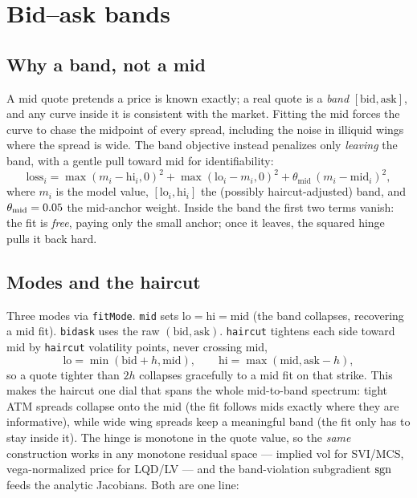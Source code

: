 \documentclass[11pt]{article}
\begin{document}
\section{Bid--ask bands}
\label{sec:band}

\subsection{Why a band, not a mid}

A mid quote pretends a price is known exactly; a real quote is a \emph{band}
$[\text{bid},\text{ask}]$, and any curve inside it is consistent with the market.
Fitting the mid forces the curve to chase the midpoint of every spread, including
the noise in illiquid wings where the spread is wide. The band objective instead
penalizes only \emph{leaving} the band, with a gentle pull toward mid for
identifiability:
\begin{equation}
\boxed{\;\text{loss}_i=\max(m_i-\text{hi}_i,0)^2+\max(\text{lo}_i-m_i,0)^2
+\theta_{\text{mid}}\,(m_i-\text{mid}_i)^2,\;}
\label{eq:band}
\end{equation}
where $m_i$ is the model value, $[\text{lo}_i,\text{hi}_i]$ the (possibly
haircut-adjusted) band, and $\theta_{\text{mid}}=0.05$ the mid-anchor
weight. Inside the band the first two terms vanish: the fit is \emph{free}, paying
only the small anchor; once it leaves, the squared hinge pulls it back hard.

\subsection{Modes and the haircut}

Three modes via \texttt{fitMode}. \texttt{mid} sets
$\text{lo}=\text{hi}=\text{mid}$ (the band collapses, recovering a mid fit).
\texttt{bidask} uses the raw $(\text{bid},\text{ask})$. \texttt{haircut} tightens
each side toward mid by \texttt{haircut} volatility points, never crossing mid,
\begin{equation}
\text{lo}=\min(\text{bid}+h,\text{mid}),\qquad
\text{hi}=\max(\text{mid},\text{ask}-h),
\end{equation}
so a quote tighter than $2h$ collapses gracefully to a mid fit on that strike.
This makes the haircut one dial that spans the whole mid-to-band spectrum: tight
ATM spreads collapse onto the mid (the fit follows mids exactly where they are
informative), while wide wing spreads keep a meaningful band (the fit only has to
stay inside it). The
hinge is monotone in the quote value, so the \emph{same} construction works in any
monotone residual space --- implied vol for SVI/MCS, vega-normalized price for
LQD/LV --- and the band-violation subgradient $\operatorname{sgn}$ feeds the analytic Jacobians.
Both are one line:
\end{document}
